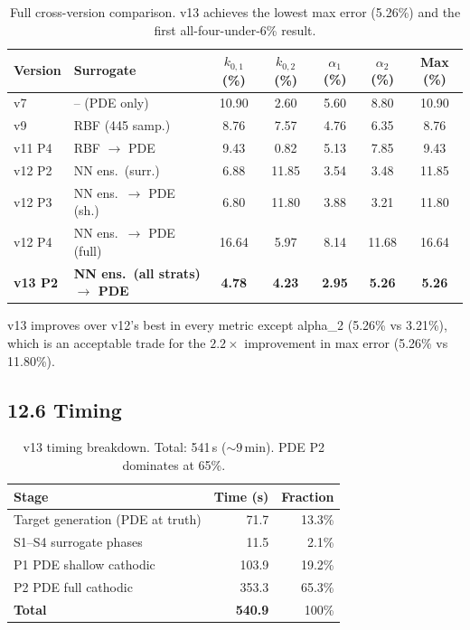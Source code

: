 \documentclass[11pt]{article}
\begin{document}
\begin{table}[H]
  \centering
  \caption{Full cross-version comparison.  v13 achieves the lowest max error
           (5.26\%) and the first all-four-under-6\% result.}
  \label{tab:v13_history}
  \begin{tabular}{ll S[round-precision=2] S[round-precision=2]
                       S[round-precision=2] S[round-precision=2]
                       S[round-precision=2]}
    \toprule
    Version & Surrogate & {$k_{0,1}$ (\%)} & {$k_{0,2}$ (\%)}
            & {$\alpha_1$ (\%)} & {$\alpha_2$ (\%)} & {Max (\%)} \\
    \midrule
    v7       & -- (PDE only)            & 10.90 &  2.60 & 5.60 & 8.80 & 10.90 \\
    v9       & RBF (445 samp.)          &  8.76 &  7.57 & 4.76 & 6.35 &  8.76 \\
    v11 P4   & RBF $\to$ PDE            &  9.43 &  0.82 & 5.13 & 7.85 &  9.43 \\
    v12 P2   & NN ens.\ (surr.)         &  6.88 & 11.85 & 3.54 & 3.48 & 11.85 \\
    v12 P3   & NN ens.\ $\to$ PDE (sh.) &  6.80 & 11.80 & 3.88 & 3.21 & 11.80 \\
    v12 P4   & NN ens.\ $\to$ PDE (full)& 16.64 &  5.97 & 8.14 &11.68 & 16.64 \\
    \textbf{v13 P2} & \textbf{NN ens.\ (all strats) $\to$ PDE}
             &\textbf{4.78} &\textbf{4.23} &\textbf{2.95} &\textbf{5.26} &\textbf{5.26} \\
    \bottomrule
  \end{tabular}
\end{table}

v13 improves over v12's best in every metric except alpha\_2 (5.26\% vs
3.21\%), which is an acceptable trade for the $2.2\times$ improvement in
max error (5.26\% vs 11.80\%).

\subsection*{12.6 Timing}

\begin{table}[H]
  \centering
  \caption{v13 timing breakdown.  Total: 541\,s (${\sim}9$\,min).
           PDE P2 dominates at 65\%.}
  \label{tab:v13_timing}
  \begin{tabular}{l r r}
    \toprule
    Stage & Time (s) & Fraction \\
    \midrule
    Target generation (PDE at truth) & 71.7 & 13.3\% \\
    S1--S4 surrogate phases          & 11.5 &  2.1\% \\
    P1 PDE shallow cathodic          & 103.9 & 19.2\% \\
    P2 PDE full cathodic             & 353.3 & 65.3\% \\
    \midrule
    \textbf{Total}                   & \textbf{540.9} & 100\% \\
    \bottomrule
  \end{tabular}
\end{table}
\end{document}
